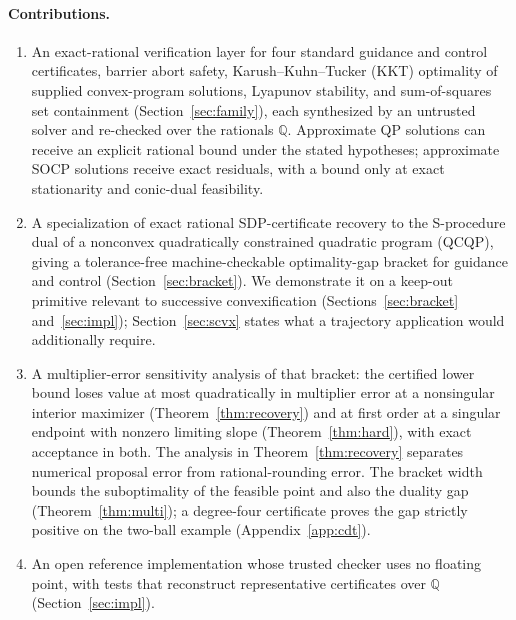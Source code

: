\documentclass[11pt]{article}
\newcommand{\Q}{\mathbb{Q}}
\theoremstyle{plain}
\theoremstyle{remark}
\begin{document}
\paragraph{Contributions.}
\begin{enumerate}\itemsep2pt
\item An exact-rational verification layer for four standard guidance and
control certificates, barrier abort safety, Karush--Kuhn--Tucker (KKT)
optimality of supplied convex-program solutions, Lyapunov stability, and sum-of-squares
set containment (Section~\ref{sec:family}), each synthesized by an untrusted
solver and re-checked over the rationals $\Q$. Approximate QP solutions
can receive an explicit rational bound under the stated hypotheses; approximate
SOCP solutions receive exact residuals, with a bound only at exact stationarity
and conic-dual feasibility.
\item A specialization of exact rational SDP-certificate recovery to the
S-procedure dual of a nonconvex quadratically constrained quadratic program
(QCQP), giving a tolerance-free machine-checkable optimality-gap bracket for
guidance and control (Section~\ref{sec:bracket}). We demonstrate it on a
keep-out primitive relevant to successive convexification
(Sections~\ref{sec:bracket} and~\ref{sec:impl}); Section~\ref{sec:scvx}
states what a trajectory application would additionally require.
\item A multiplier-error sensitivity analysis of that bracket: the certified lower bound loses
value at most quadratically in multiplier error at a nonsingular
interior maximizer
(Theorem~\ref{thm:recovery}) and at first order at a singular endpoint with
nonzero limiting slope (Theorem~\ref{thm:hard}), with exact acceptance in both. The
analysis in Theorem~\ref{thm:recovery} separates numerical proposal error
from rational-rounding error.
The bracket width bounds the suboptimality of the feasible point and also the
duality gap (Theorem~\ref{thm:multi}); a degree-four certificate proves the
gap strictly positive on the two-ball example (Appendix~\ref{app:cdt}).
\item An open reference implementation whose trusted checker uses no floating
point, with tests that reconstruct representative certificates over $\Q$
(Section~\ref{sec:impl}).
\end{enumerate}
\end{document}
